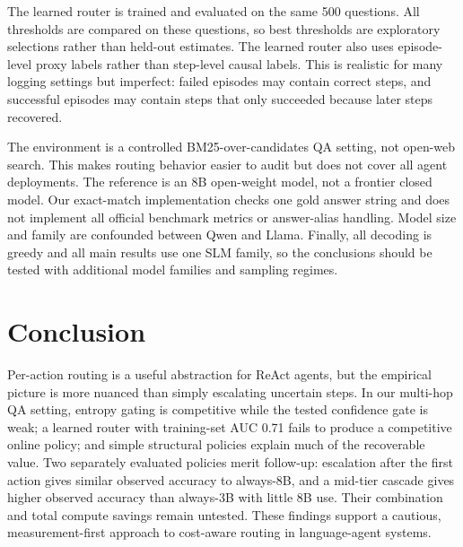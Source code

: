 \documentclass[sigplan,screen,review,anonymous,nonacm]{acmart}
\begin{document}
The learned router is trained and evaluated on the same 500 questions.
All thresholds are compared on these questions, so best thresholds are
exploratory selections rather than held-out estimates. The learned router
also uses episode-level proxy labels rather than step-level causal labels. This is realistic for many logging settings but imperfect:
failed episodes may contain correct steps, and successful episodes may contain
steps that only succeeded because later steps recovered.

The environment is a controlled BM25-over-candidates QA setting, not open-web
search. This makes routing behavior easier to audit but does not cover all
agent deployments. The reference is an 8B open-weight model, not a frontier closed model.
Our exact-match implementation checks one gold answer string and does not
implement all official benchmark metrics or answer-alias handling.
Model size and family are confounded between Qwen and Llama. Finally, all decoding is greedy and all main results use one SLM
family, so the conclusions should be tested with additional model families and
sampling regimes.

\section{Conclusion}

Per-action routing is a useful abstraction for ReAct agents, but the empirical
picture is more nuanced than simply escalating uncertain steps. In our
multi-hop QA setting, entropy gating is competitive while the tested
confidence gate is weak; a learned router with training-set AUC 0.71 fails to produce a
competitive online policy; and simple structural policies explain much of the
recoverable value. Two separately evaluated policies merit follow-up: escalation after the
first action gives similar observed accuracy to always-8B, and a mid-tier
cascade gives higher observed accuracy than always-3B with little 8B use.
Their combination and total compute savings remain untested. These findings support a cautious, measurement-first approach to
cost-aware routing in language-agent systems.



\end{document}
